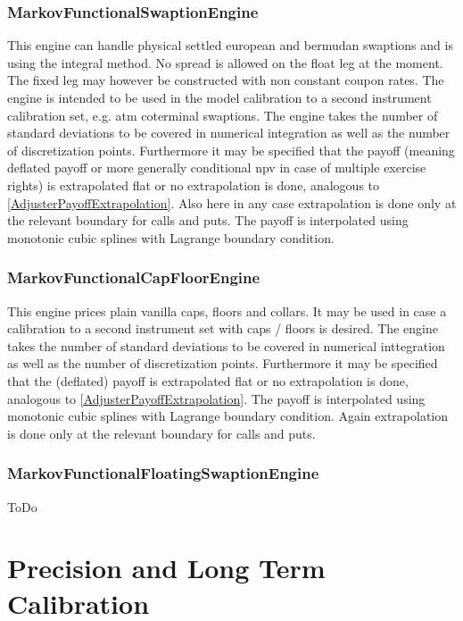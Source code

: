 \documentclass{amsart}
\theoremstyle{plain}
\numberwithin{equation}{section}
\begin{document}
\subsubsection{MarkovFunctionalSwaptionEngine}\label{MarkovFunctionalSwaptionEngine}
This engine can handle physical settled european and bermudan swaptions and is using the integral method. No spread is allowed on the float leg at the moment. The fixed leg may however be constructed with non constant coupon rates. The engine is intended to be used in the model calibration to a second instrument calibration set, e.g. atm coterminal swaptions.
The engine takes the number of standard deviations to be covered in numerical integration as well as the number of discretization points. Furthermore it may be specified that the payoff (meaning deflated payoff or more generally conditional npv in case of multiple exercise rights)  is extrapolated flat or no extrapolation is done,  analogous to \ref{AdjusterPayoffExtrapolation}. Also here in any case extrapolation is done only at the relevant boundary for calls and puts. The payoff is interpolated using monotonic cubic splines with Lagrange boundary condition.

\subsubsection{MarkovFunctionalCapFloorEngine}
This engine prices plain vanilla caps, floors and collars. It may be used in case a calibration to a second instrument set with caps / floors is desired. The engine takes the number of standard deviations to be covered in numerical inttegration as well as the number of discretization points. Furthermore it may be specified that the (deflated) payoff is extrapolated flat or no extrapolation is done,  analogous to \ref{AdjusterPayoffExtrapolation}. The payoff is interpolated using monotonic cubic splines with Lagrange boundary condition. Again extrapolation is done only at the relevant boundary for calls and puts.


\subsubsection{MarkovFunctionalFloatingSwaptionEngine}
ToDo

\section{Precision and Long Term Calibration}\label{precision}
\end{document}
